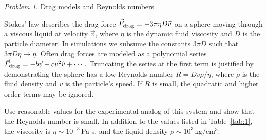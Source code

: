 \documentclass[preprint,showpacs,preprintnumbers,amsmath,amssymb,aps,prb]{revtex4-1}
\theoremstyle{remark}
\newtheorem{problem}{Problem}
\begin{document}
  \begin{problem}{Drag models and Reynolds numbers}
\label{ex:reynolds}

\noindent Stokes' law describes the drag force %
  $\vec{F}_{\rm drag} = -3 \pi \eta D \vec{v}$ 
  on a sphere
  moving through a viscous liquid at velocity $\vec{v}$,
  where $\eta$ is the dynamic fluid viscosity and 
  $D$ is the particle diameter.\cite{Taylor2005}
  In simulations we
  subsume the constants $3 \pi D$
  such that $3 \pi D \eta \rightarrow \eta $.
  Often drag forces are
  modeled as a polynomial series\cite{Taylor2005}
$\vec{F}_{\rm drag} = -b \vec{v} - c v^2 \hat{v} + \cdots\,.$
Truncating the series at the first term
  is justified by demonstrating the sphere
  has a low Reynolds number  
  $R = D v \rho / \eta$,
  where $\rho$ is the fluid density and $v$ is the particle's speed.
  If $R$ is small, the quadratic and higher order terms
  may be ignored.

Use reasonable values for the
  experimental analog of this system and show 
that the Reynolds number is small.
In addition to the values listed in Table~\ref{tab:1},
the viscosity is $\eta \sim 10^{-3}$\,Pa-s,\cite{Volpe2013}
and 
the liquid density 
$\rho \sim 10^3$\,kg/cm$^3$.\cite{asce}

\end{problem}


  
\end{document}
